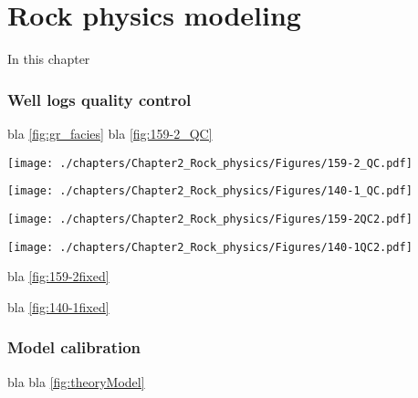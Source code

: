 \chapter{Rock physics modeling}
In this chapter

\subsection{Well logs quality control}
bla \ref{fig:gr_facies}
bla \ref{fig:159-2_QC}
\begin{sidewaysfigure}
\centering
\scalebox{0.5}
{\texttt{[image: ./chapters/Chapter2\_Rock\_physics/Figures/159-2\_QC.pdf]}}
\caption{Fuel Metabolism} 
\label{fig:159-2_QC}
\end{sidewaysfigure}

\begin{sidewaysfigure}
\centering
\scalebox{0.5}
{\texttt{[image: ./chapters/Chapter2\_Rock\_physics/Figures/140-1\_QC.pdf]}}
\caption{Fuel Metabolism} 
\label{fig:159-2_QC}
\end{sidewaysfigure}

\begin{sidewaysfigure}
\centering
\scalebox{0.5}
{\texttt{[image: ./chapters/Chapter2\_Rock\_physics/Figures/159-2QC2.pdf]}}
\caption{Fuel Metabolism} 
\label{fig:159-2QC2}
\end{sidewaysfigure}

\begin{sidewaysfigure}
\centering
\scalebox{0.5}
{\texttt{[image: ./chapters/Chapter2\_Rock\_physics/Figures/140-1QC2.pdf]}}
\caption{Fuel Metabolism} 
\label{fig:140-1QC2}
\end{sidewaysfigure}


bla \ref{fig:159-2fixed}

bla \ref{fig:140-1fixed}


\subsection{Model calibration}
bla
bla \ref{fig:theoryModel}



